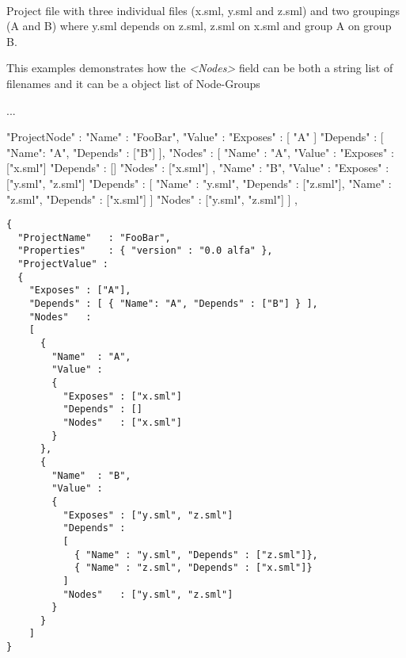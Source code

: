 \begin{example}\ 

  Project file with three individual files (x.sml, y.sml and z.sml) and two
  groupings (A and B) where y.sml depends on z.sml, z.sml on x.sml and group A
  on group B.

  This examples demonstrates how the \textit{<Nodes>} field can be both a string
  list of filenames and it can be a object list of Node-Groups

...

"ProjectNode" :
{
        "Name"  : "FooBar",
        "Value" :
        {
          "Exposes" : [ "A" ]
          "Depends" : [ { "Name": "A", "Depends" : ["B"] } ],
          "Nodes"   : 
          [
      {
        "Name"  : "A",
        "Value" :
        {
          "Exposes" : ["x.sml"]
          "Depends" : []
          "Nodes"   : ["x.sml"]
        }
      },
      {
        "Name"  : "B",
        "Value" :
        {
          "Exposes" : ["y.sml", "z.sml"]
          "Depends" : 
          [ 
            { "Name" : "y.sml", "Depends" : ["z.sml"]},
            { "Name" : "z.sml", "Depends" : ["x.sml"]} 
          ]
          "Nodes"   : ["y.sml", "z.sml"]
        }
      }          
          ]
        }
},


\begin{lstlisting}
{
  "ProjectName"   : "FooBar",
  "Properties"    : { "version" : "0.0 alfa" },
  "ProjectValue" :
  {
    "Exposes" : ["A"],
    "Depends" : [ { "Name": "A", "Depends" : ["B"] } ],
    "Nodes"   : 		
    [
      {
        "Name"  : "A",
        "Value" :
        {
          "Exposes" : ["x.sml"]
          "Depends" : []
          "Nodes"   : ["x.sml"]
        }
      },
      {
        "Name"  : "B",
        "Value" :
        {
          "Exposes" : ["y.sml", "z.sml"]
          "Depends" : 
          [ 
            { "Name" : "y.sml", "Depends" : ["z.sml"]},
            { "Name" : "z.sml", "Depends" : ["x.sml"]} 
          ]
          "Nodes"   : ["y.sml", "z.sml"]
        }
      }
    ]
}
\end{lstlisting}

\end{example}


